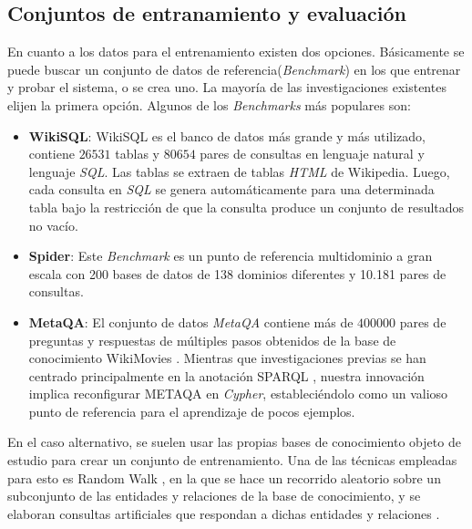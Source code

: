 \subsection{Conjuntos de entranamiento y evaluación} \label{neurosymbolic_approach_bechmarks}

En cuanto a los datos para el entrenamiento existen dos opciones. Básicamente se puede buscar un conjunto de datos de referencia(\textit{Benchmark}) en los que entrenar y probar el sistema, o se crea uno. La mayoría de las investigaciones existentes elijen la primera opción. Algunos de los \textit{Benchmarks} más populares son:

\begin{itemize}
	\item \textbf{WikiSQL}: WikiSQL \cite{wikisql} es el banco de datos más grande y más utilizado, contiene $26531$ tablas y $80654$ pares de consultas en lenguaje natural y lenguaje \textit{SQL}. Las tablas se extraen de tablas \textit{HTML} de Wikipedia. Luego, cada consulta en \textit{SQL} se genera automáticamente para una determinada tabla bajo la restricción de que la consulta produce un conjunto de resultados no vacío.

	\item \textbf{Spider}:	 Este \textit{Benchmark} \cite{spiderdataset} es un punto de referencia multidominio a gran escala con 200 bases de datos de 138 dominios diferentes y 10.181 pares de consultas.

	\item \textbf{MetaQA}: El conjunto de datos \textit{MetaQA} \cite{zhangetal2018} contiene más de $400000$ pares de preguntas y respuestas de múltiples pasos obtenidos de la base de conocimiento WikiMovies \cite{milleretal2016}. Mientras que investigaciones previas se han centrado principalmente en la anotación SPARQL \cite{huangetal2021}, nuestra innovación implica reconfigurar METAQA en \textit{Cypher}, estableciéndolo como un valioso punto de referencia para el aprendizaje de pocos ejemplos.

\end{itemize}

En el caso alternativo, se suelen usar las propias bases de conocimiento objeto de
estudio para crear un conjunto de entrenamiento. Una de las técnicas empleadas para
esto es Random Walk \cite{randomwalk}, en la que se hace un recorrido aleatorio sobre un subconjunto de las entidades y relaciones de la base de conocimiento, y se elaboran consultas artificiales que respondan a dichas entidades y relaciones \cite{dominikopitz2022}.


